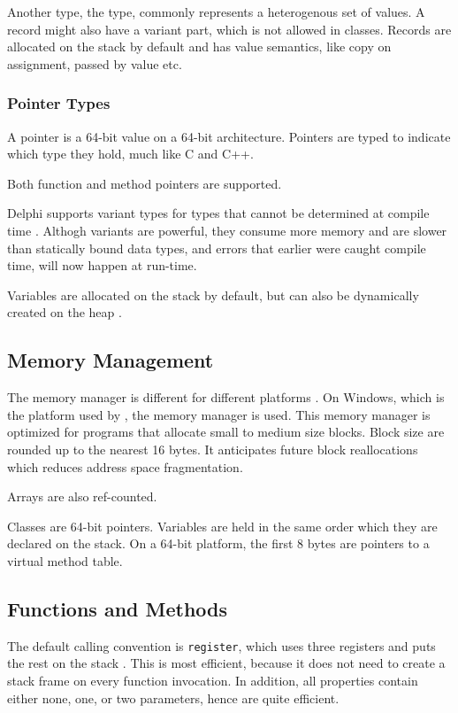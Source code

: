 Another type, the  type, commonly represents a heterogenous set of values. A record might also have a variant part, which is not allowed in classes. Records are allocated on the stack by default and has value semantics, like copy on assignment, passed by value etc.

\subsubsection{Pointer Types}
\label{ssub:Pointer Types}
A pointer is a 64-bit value on a 64-bit architecture. Pointers are typed to indicate which type they hold, much like C and C++.

Both function and method pointers are supported.

Delphi supports variant types for types that cannot be determined at compile time \cite{noauthor_undated-mx}. Althogh variants are powerful, they consume more memory and are slower than statically bound data types, and errors that earlier were caught compile time, will now happen at run-time.

Variables are allocated on the stack by default, but can also be dynamically created on the heap \cite{noauthor_undated-lw}.

\subsection{Memory Management}
\label{sub:Memory Management}
The memory manager is different for different platforms \cite{noauthor_undated-ys}. On Windows, which is the platform used by \gap, the  memory manager is used. This memory manager is optimized for programs that allocate small to medium size blocks. Block size are rounded up to the nearest 16 bytes. It anticipates future block reallocations which reduces address space fragmentation.

Arrays are also ref-counted.

Classes are 64-bit pointers. Variables are held in the same order which they are declared on the stack. On a 64-bit platform, the first 8 bytes are pointers to a virtual method table.

\subsection{Functions and Methods}
\label{sub:Functions and Methods}
The default calling convention is \texttt{register}, which uses three registers and puts the rest on the stack \cite{noauthor_undated-xi}. This is most efficient, because it does not need to create a stack frame on every function invocation. In addition, all properties contain either none, one, or two parameters, hence are quite efficient. 

